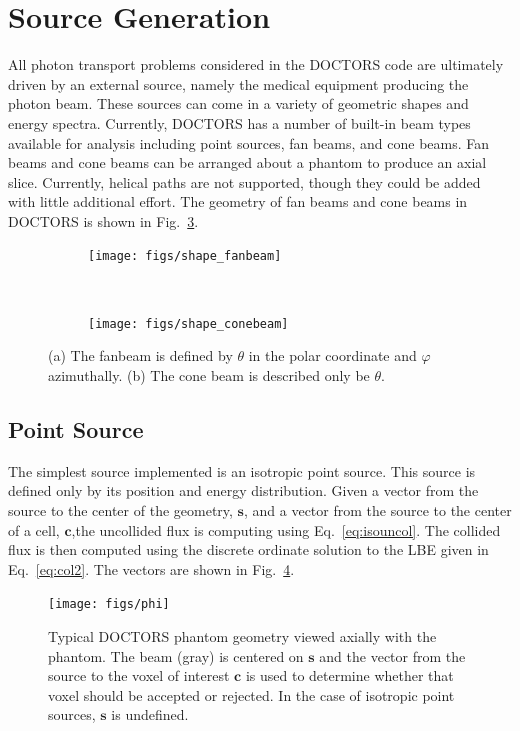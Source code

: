 \section{Source Generation}
All photon transport problems considered in the DOCTORS code are ultimately driven by an external source, namely the medical equipment producing the photon beam. These sources can come in a variety of geometric shapes and energy spectra. Currently, DOCTORS has a number of built-in beam types available for analysis including point sources, fan beams, and cone beams. Fan beams and cone beams can be arranged about a phantom to produce an axial slice. Currently, helical paths are not supported, though they could be added with little additional effort. The geometry of fan beams and cone beams in DOCTORS is shown in Fig.~\ref{fig:shape}.

\begin{figure}
    \centering
    \begin{subfigure}[b]{.45 \textwidth}
        \texttt{[image: figs/shape\_fanbeam]}
        \caption{}
        \label{fig:shape_fanbeam}
    \end{subfigure}
    ~
    \begin{subfigure}[b]{.45 \textwidth}
        \texttt{[image: figs/shape\_conebeam]}
        \caption{}
        \label{fig:shape_conebeam}
    \end{subfigure}
    \caption{(a) The fanbeam is defined by $\theta$ in the polar coordinate and $\varphi$ azimuthally. (b) The cone beam is described only be $\theta$.}\label{fig:shape}
\end{figure}

\subsection{Point Source}
The simplest source implemented is an isotropic point source. This source is defined only by its position and energy distribution. Given a vector from the source to the center of the geometry, $\boldsymbol{s}$, and a vector from the source to the center of a cell, $\boldsymbol{c}$,the uncollided flux is computing using Eq.~\ref{eq:isouncol}. The collided flux is then computed using the discrete ordinate solution to the LBE given in Eq.~\ref{eq:col2}. The vectors are shown in Fig.~\ref{fig:phi}.

\begin{figure}[tb]
  \begin{center}
   \texttt{[image: figs/phi]}
  \end{center}
  \caption{Typical DOCTORS phantom geometry viewed axially with the phantom. The beam (gray) is centered on $\boldsymbol{s}$ and the vector from the source to the voxel of interest $\boldsymbol{c}$ is used to determine whether that voxel should be accepted or rejected. In the case of isotropic point sources, $\boldsymbol{s}$ is undefined.}
\label{fig:phi}
\end{figure}

